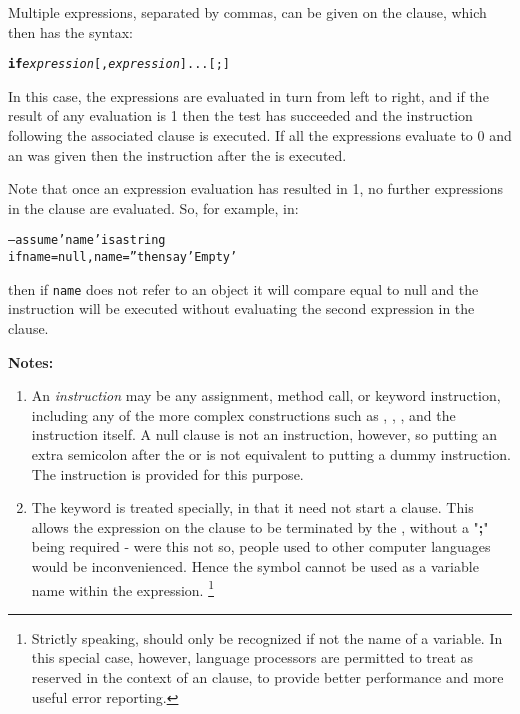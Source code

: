 Multiple expressions, separated by commas, can be given on the
 clause, which then has the syntax:
\begin{shaded}
\begin{alltt}
\textbf{if} \emph{expression}[, \emph{expression}]... [;]
\end{alltt}
\end{shaded}
In this case, the expressions are evaluated in turn from left to
right, and if the result of any evaluation is 1 then the test has
succeeded and the instruction following the associated 
clause is executed.
If all the expressions evaluate to 0 and an  was given
then the instruction after the  is executed.
 
Note that once an expression evaluation has resulted in 1, no further
expressions in the clause are evaluated.  So, for example, in:
\begin{alltt}
-- assume 'name' is a string
if name=null, name='' then say 'Empty'
\end{alltt}
then if \texttt{name} does not refer to an object it will compare equal to
null and the  instruction will be executed without
evaluating the second expression in the  clause.
\begin{shaded}\noindent
\textbf{Notes:}
\begin{enumerate}
\item An \emph{instruction} may be any assignment, method call, or
keyword instruction, including any of the more complex constructions
such as , , , and the 
instruction itself.
A null clause is not an instruction, however, so putting an extra
semicolon after the  or  is not equivalent to
putting a dummy instruction.
The  instruction is provided for this purpose.
\item The keyword  is treated specially, in that it need not start a
clause.
This allows the expression on the  clause to be terminated by
the , without a "\textbf{;}" being required -
were this not so, people used to other computer languages would
be inconvenienced.
Hence the symbol  cannot be used as a variable name within
the expression.
\footnote{
Strictly speaking,  should only be recognized if not
the name of a variable.  In this special case, however, \nr{} language
processors are permitted to treat  as reserved in the
context of an  clause, to provide better performance and
more useful error reporting.
}
\end{enumerate}
\end{shaded}\indent
